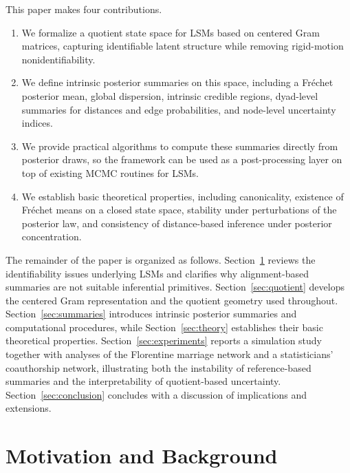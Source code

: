 \documentclass[12pt]{article}
\newcommand{\Frechet}{Fr\'{e}chet\xspace}
\begin{document}
This paper makes four contributions.
\begin{enumerate}
\item We formalize a quotient state space for LSMs based on centered Gram matrices,
capturing identifiable latent structure while removing rigid-motion nonidentifiability.
\item We define intrinsic posterior summaries on this space, including a \Frechet posterior mean,
global dispersion, intrinsic credible regions, dyad-level summaries for distances and edge
probabilities, and node-level uncertainty indices.
\item We provide practical algorithms to compute these summaries directly from posterior draws, so
the framework can be used as a post-processing layer on top of existing MCMC routines for 
LSMs.
\item We establish basic theoretical properties, including canonicality, existence of \Frechet means
on a closed state space, stability under perturbations of the posterior law, and consistency of
distance-based inference under posterior concentration.
\end{enumerate}

The remainder of the paper is organized as follows. Section~\ref{sec:background} reviews the
identifiability issues underlying LSMs and clarifies why alignment-based summaries are not suitable 
inferential primitives. Section~\ref{sec:quotient} develops the centered Gram representation and the
quotient geometry used throughout. Section~\ref{sec:summaries} introduces intrinsic posterior
summaries and computational procedures, while Section~\ref{sec:theory} establishes their basic
theoretical properties. Section~\ref{sec:experiments} reports a simulation study together with
analyses of the Florentine marriage network and a statisticians' coauthorship network, illustrating
both the instability of reference-based summaries and the interpretability of quotient-based
uncertainty. Section~\ref{sec:conclusion} concludes with a discussion of implications and
extensions.




\section{Motivation and Background}\label{sec:background}
\end{document}
